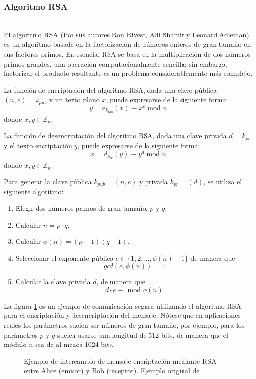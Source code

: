 \subsubsection{Algoritmo RSA}
\hfil \\
El algoritmo RSA (Por sus autores Ron Rivest, Adi Shamir y Leonard Adleman) es un algoritmo basado en la factorización de números enteros de gran tamaño en sus factores primos.
En esencia, RSA se basa en la multiplicación de dos números primos grandes, una operación computacionalmente sencilla; sin embargo, factorizar el producto resultante es un problema considerablemente más complejo.

La función de encriptación del algoritmo RSA, dada una clave pública $(n,e)=k_{pub}$ y un texto plano $x$, puede expresarse de la siguiente forma:
$$y=e_{k_{pub}}(x) \equiv x^e \text{ mod } n$$
donde $x,y \in \mathbb{Z}_n$.

La función de desencriptación del algoritmo RSA, dada una clave privada $d=k_{pr}$ y el texto encriptación $y$, puede expresarse de la siguiente forma:
$$x=d_{k_{pr}}(y) \equiv y^d \text{ mod } n$$
donde $x,y \in \mathbb{Z}_n$.

Para generar la clave pública $k_{pub} = (n,e)$ y privada $k_{pr} = (d)$, se utiliza el siguiente algoritmo:
\begin{enumerate}
    \item Elegir dos números primos de gran tamaño, $p$ y $q$.
    \item Calcular $n=p \cdot q$.
    \item Calcular $\phi(n) = (p-1)(q-1)$.
    \item Seleccionar el exponente público $e \in \{1,2,\dots,\phi(n)-1\}$ de manera que $$gcd(e,\phi(n)) = 1$$
    \item Calcular la clave privada $d$, de manera que $$d \cdot e \equiv \text{ mod } \phi(n)$$
\end{enumerate}



La figura \ref{fig:RSA_example} es un ejemplo de comunicación segura utilizando el algoritmo RSA para el encriptación y desencriptación del mensaje. Nótese que en aplicaciones reales los parámetros suelen ser números de gran tamaño, por ejemplo, para los parámetros $p$ y $q$ suelen usarse una longitud de 512 bits, de manera que el módulo $n$ sea de al menos 1024 bits.
\begin{figure}[H]
    \centering
    \noindent
    \caption{Ejemplo de intercambio de mensaje encriptación mediante RSA entre Alice (emisor) y Bob (receptor). Ejemplo original de \cite{paar-2011}. }
    \label{fig:RSA_example}
\end{figure}

